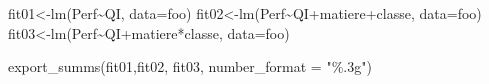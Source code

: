 \documentclass[
]{book}
\newenvironment{Shaded}{\begin{snugshade}}{\end{snugshade}}
\newcommand{\AttributeTok}[1]{\textcolor[rgb]{0.77,0.63,0.00}{#1}}
\newcommand{\FunctionTok}[1]{\textcolor[rgb]{0.00,0.00,0.00}{#1}}
\newcommand{\NormalTok}[1]{#1}
\newcommand{\OtherTok}[1]{\textcolor[rgb]{0.56,0.35,0.01}{#1}}
\newcommand{\SpecialCharTok}[1]{\textcolor[rgb]{0.00,0.00,0.00}{#1}}
\newcommand{\StringTok}[1]{\textcolor[rgb]{0.31,0.60,0.02}{#1}}
\begin{document}
\begin{Shaded}
\begin{Highlighting}[]
\NormalTok{fit01}\OtherTok{\textless{}{-}}\FunctionTok{lm}\NormalTok{(Perf}\SpecialCharTok{\textasciitilde{}}\NormalTok{QI, }\AttributeTok{data=}\NormalTok{foo)}
\NormalTok{fit02}\OtherTok{\textless{}{-}}\FunctionTok{lm}\NormalTok{(Perf}\SpecialCharTok{\textasciitilde{}}\NormalTok{QI}\SpecialCharTok{+}\NormalTok{matiere}\SpecialCharTok{+}\NormalTok{classe, }\AttributeTok{data=}\NormalTok{foo)}
\NormalTok{fit03}\OtherTok{\textless{}{-}}\FunctionTok{lm}\NormalTok{(Perf}\SpecialCharTok{\textasciitilde{}}\NormalTok{QI}\SpecialCharTok{+}\NormalTok{matiere}\SpecialCharTok{*}\NormalTok{classe, }\AttributeTok{data=}\NormalTok{foo)}

\FunctionTok{export\_summs}\NormalTok{(fit01,fit02, fit03, }\AttributeTok{number\_format =} \StringTok{"\%.3g"}\NormalTok{)}
\end{Highlighting}
\end{Shaded}

 
  \providecommand{\huxb}[2]{\arrayrulecolor[RGB]{#1}\global\arrayrulewidth=#2pt}
  \providecommand{\huxvb}[2]{\color[RGB]{#1}\vrule width #2pt}
  \providecommand{\huxtpad}[1]{\rule{0pt}{#1}}
  \providecommand{\huxbpad}[1]{\rule[-#1]{0pt}{#1}}
\end{document}
